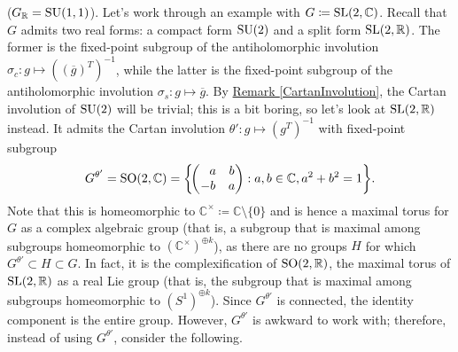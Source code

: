 \noindent\begin{example}\textup{($G_\mathbb{R} = \textup{SU}(1,1)$).} %
Let's work through an example with $G \coloneqq \textup{SL}(2, \mathbb{C})$. Recall that $G$ admits two real forms: a compact form $\textup{SU}(2)$ and a split form $\textup{SL}(2, \mathbb{R})$. The former is the fixed-point subgroup of the antiholomorphic involution $\sigma_c : g \mapsto ((\overline{g})^T)^{-1}$, while the latter is the fixed-point subgroup of the antiholomorphic involution $\sigma_s : g \mapsto \overline{g}$. By \hyperref[CartanInvolution]{Remark \ref*{CartanInvolution}}, the Cartan involution of $\textup{SU}(2)$ will be trivial; this is a bit boring, so let's look at $\textup{SL}(2, \mathbb{R})$ instead. It admits the Cartan involution $\theta' : g \mapsto (g^T)^{-1}$ with fixed-point subgroup
\begin{align*}
\begin{split}
G^{\theta'} = \textup{SO}(2, \mathbb{C}) = \left\{\!\begin{pmatrix}\hphantom{-}a&b\\-b&a\end{pmatrix} : a, b \in \mathbb{C}, a^2 + b^2 = 1\right\}\!.
\end{split}
\end{align*}
\noindent Note that this is homeomorphic to $\mathbb{C}^\times \coloneqq \mathbb{C}\!\setminus\!\{0\}$ and is hence a maximal torus for $G$ as a complex algebraic group (that is, a subgroup that is maximal among subgroups homeomorphic to $(\mathbb{C}^\times)^{\oplus k}$), as there are no groups $H$ for which $G^{\theta'} \subset H \subset G$. In fact, it is the complexification of $\textup{SO}(2, \mathbb{R})$, the maximal torus of $\textup{SL}(2, \mathbb{R})$ as a real Lie group (that is, the subgroup that is maximal among subgroups homeomorphic to $(S^1)^{\oplus k}$). Since $G^{\theta'}$ is connected, the identity component is the entire group. However, $G^{\theta'}$ is awkward to work with; therefore, instead of using $G^{\theta'}$, consider the following.\newpage


\end{example}
